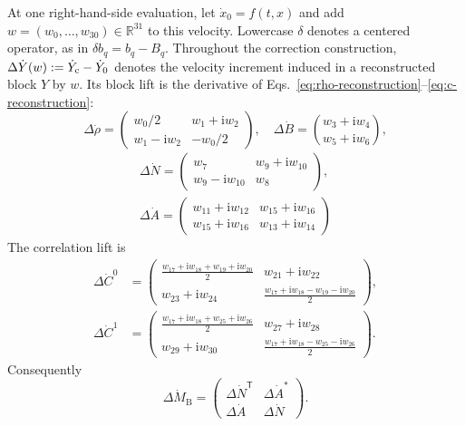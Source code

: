 \documentclass[10pt,twocolumn]{article}
\newcommand{\ii}{\mathrm i}
\newcommand{\R}{\mathbb R}
\newcommand{\MB}{M_{\mathrm B}}
\begin{document}
At one right-hand-side evaluation, let $\dot x_0=f(t,x)$ and add
$w=(w_0,\ldots,w_{30})\in\R^{31}$ to this velocity.  Lowercase $\delta$
denotes a centered operator, as in $\delta b_q=b_q-B_q$.  Throughout the
correction construction,
$\Delta\dot Y(w):=\dot Y_{\rm c}-\dot Y_0$ denotes the velocity increment
induced in a reconstructed block $Y$ by $w$.  Its block lift is the derivative
of Eqs.~\eqref{eq:rho-reconstruction}--\eqref{eq:c-reconstruction}:
\begin{equation}
\Delta\dot\rho=
\begin{pmatrix}w_0/2&w_1+\ii w_2\\w_1-\ii w_2&-w_0/2\end{pmatrix},
\quad
\Delta\dot B=\binom{w_3+\ii w_4}{w_5+\ii w_6},
\label{eq:lift-rho-b}
\end{equation}
\begin{equation}
\begin{gathered}
\Delta\dot N=
\begin{pmatrix}w_7&w_9+\ii w_{10}\\w_9-\ii w_{10}&w_8\end{pmatrix},\\[2pt]
\Delta\dot A=
\begin{pmatrix}
w_{11}+\ii w_{12}&w_{15}+\ii w_{16}\\
w_{15}+\ii w_{16}&w_{13}+\ii w_{14}
\end{pmatrix}
\end{gathered}
\label{eq:lift-na}
\end{equation}
The correlation lift is
{\scriptsize
\begin{equation}
\begin{aligned}
\Delta\dot C^0&=
\begin{pmatrix}
\frac{w_{17}+\ii w_{18}+w_{19}+\ii w_{20}}2&w_{21}+\ii w_{22}\\
w_{23}+\ii w_{24}&\frac{w_{17}+\ii w_{18}-w_{19}-\ii w_{20}}2
\end{pmatrix},\\
\Delta\dot C^1&=
\begin{pmatrix}
\frac{w_{17}+\ii w_{18}+w_{25}+\ii w_{26}}2&w_{27}+\ii w_{28}\\
w_{29}+\ii w_{30}&\frac{w_{17}+\ii w_{18}-w_{25}-\ii w_{26}}2
\end{pmatrix}.
\end{aligned}
\label{eq:lift-c}
\end{equation}}
Consequently
\begin{equation}
\Delta\dot\MB=
\begin{pmatrix}\Delta\dot N^{\mathsf T}&\Delta\dot A^*\\
\Delta\dot A&\Delta\dot N\end{pmatrix}.
\label{eq:lift-mb}
\end{equation}
\end{document}
